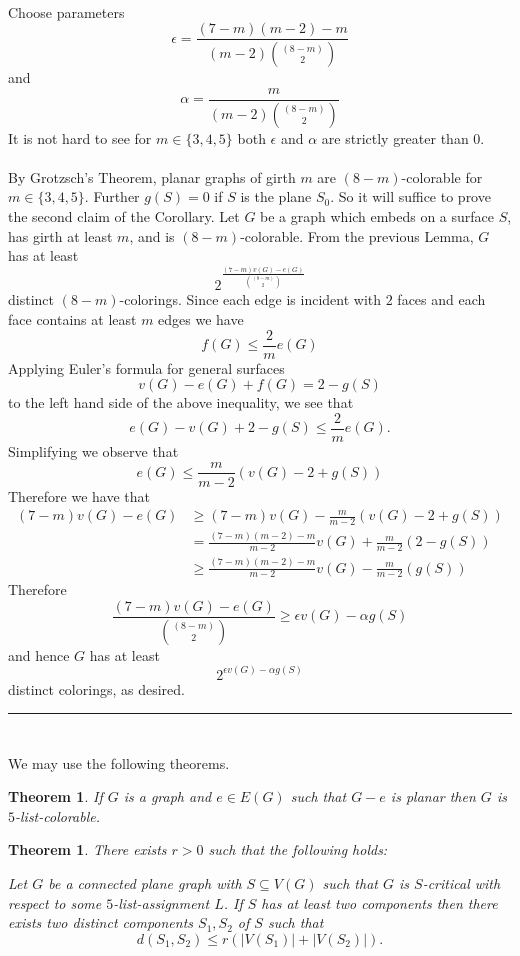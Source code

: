 \documentclass[letterpaper,12pt,oneside,onecolumn]{article}
\newenvironment{proof}{{\bf Proof:  }}{\hfill\rule{2mm}{2mm}}
\newtheorem{theorem}[fact]{Theorem}
\begin{document}
\begin{proof}
\paragraph{}
Choose parameters
$$\epsilon = \frac{(7-m)(m-2) - m}{(m-2){(8-m) \choose 2}}$$
and
$$\alpha = \frac{m}{(m-2){(8-m) \choose 2}}$$
It is not hard to see for $m \in \{3,4,5\}$ both $\epsilon$ and $\alpha$ are strictly greater than $0$.
\paragraph{}
By Grotzsch's Theorem, planar graphs of girth $m$ are $(8-m)$-colorable for $m \in \{3,4,5\}$. Further $g(S) = 0$ if $S$ is the plane $S_0$. So it will suffice to prove the second claim of the Corollary. Let $G$ be a graph which embeds on a surface $S$, has girth at least $m$, and is $(8-m)$-colorable. From the previous Lemma, $G$ has at least
$$2^{\frac{(7-m)v(G) - e(G)}{{(8-m)\choose 2}}}$$
distinct $(8-m)$-colorings. Since each edge is incident with $2$ faces and each face contains at least $m$ edges we have
$$f(G) \leq \frac{2}{m}e(G)$$
Applying Euler's formula for general surfaces
$$ v(G) - e(G) + f(G) = 2- g(S)$$
to the left hand side of the above inequality, we see that
$$ e(G) - v(G) + 2-g(S) \leq \frac{2}{m}e(G).$$
Simplifying we observe that
$$e(G) \leq \frac{m}{m-2}(v(G) - 2 + g(S))$$
Therefore we have that
\begin{align*}
(7-m)v(G) - e(G) &\geq (7-m)v(G) -\frac{m}{m-2}(v(G) - 2 + g(S))\\
&= \frac{(7-m)(m-2) - m}{m-2}v(G) + \frac{m}{m-2} (2-g(S)) \\
&\geq \frac{(7-m)(m-2) - m}{m-2}v(G) - \frac{m}{m-2} (g(S))
\end{align*}
Therefore
$$\frac{(7-m)v(G) - e(G)}{{(8-m)\choose 2}} \geq \epsilon v(G) - \alpha g(S)$$
and hence $G$ has at least
$$2^{\epsilon v(G) - \alpha g(S)}$$
distinct colorings, as desired.
\end{proof}
\section{}
\paragraph{}
We may use the following theorems.
\begin{theorem}\label{th:g-e-choosable}
	If $G$ is a graph and $e\in E(G)$ such that $G-e$ is planar then $G$ is $5$-list-colorable.
\end{theorem}
\begin{theorem}\label{th:closeness}
	There exists $r>0$ such that the following holds:
	
	Let $G$ be a connected plane graph with $S\subseteq V(G)$ such that $G$ is $S$-critical with respect to some $5$-list-assignment $L$. If $S$ has at least two components then there exists two distinct components $S_1,S_2$ of $S$ such that
	$$d(S_1,S_2) \leq r(|V(S_1)| + |V(S_2)|).$$
\end{theorem}
\end{document}
